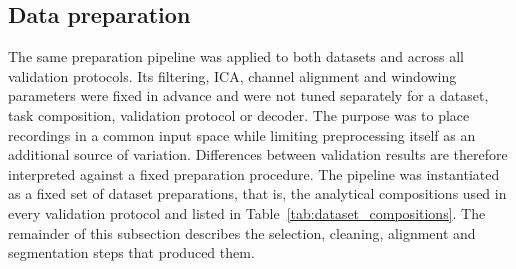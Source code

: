 \documentclass[10pt,letterpaper]{article}
\newcommand{\rev}[1]{#1}
\begin{document}
\subsection*{Data preparation}

\rev{The same preparation pipeline was applied to
both datasets and across all validation protocols.
Its filtering, ICA, channel
alignment and windowing parameters were fixed in advance and were not tuned
separately for a dataset, task composition, validation protocol or decoder. The
purpose was to place recordings in a common input space while limiting
preprocessing itself as an additional source of variation. Differences between
validation results are therefore interpreted against a fixed preparation
procedure. The pipeline was instantiated as a fixed set of dataset
preparations, that is, the analytical compositions used in every validation
protocol and listed in
Table~\ref{tab:dataset_compositions}. The remainder of this subsection
describes the selection, cleaning, alignment and segmentation steps that
produced them.}
\end{document}

